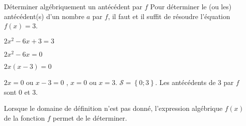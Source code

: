 \begin{pageCours}
\begin{MtT}{Déterminer algébriquement un antécédent par $f$}
Pour déterminer le (ou les) antécédent(s) d'un nombre $a$ par $f$, il faut et il suffit de résoudre l'équation $f(x) = 3$.

$2x^2 - 6x + 3 = 3$

$2x^2 - 6x = 0$

$2x (x - 3) = 0$

$2x = 0$ ou $x - 3 = 0$ , $x = 0$ ou  $x = 3$. $\mathscr{S}=\left\lbrace 0;3\right\rbrace $. Les antécédents de 3 par $f$ sont 0 et 3.

\end{MtT}



\begin{Rq} 
Lorsque le domaine de définition n'est pas donné, l'expression algébrique $f(x)$ de la fonction $f$ permet de le déterminer.
\end{Rq} 

\end{pageCours} %


